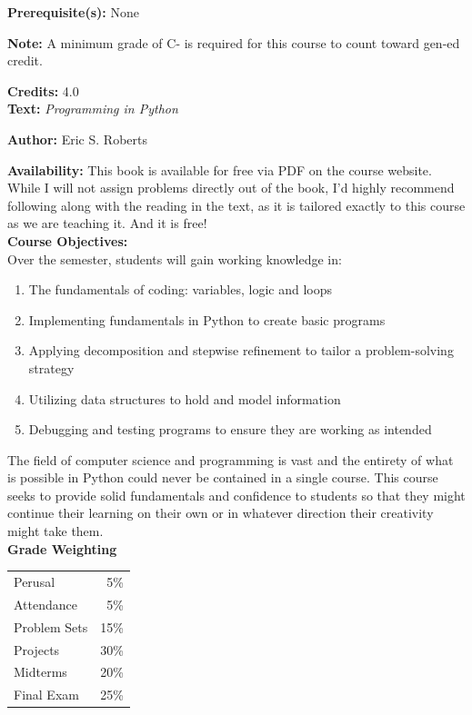 \documentclass[11pt]{article}
\begin{document}
\textbf {Prerequisite(s):} None

\textbf {Note:} A minimum grade of C- is required for this course to count toward gen-ed credit. 

\textbf {Credits:} 4.0 \\

\textbf {\large Text:} \emph{Programming in Python} 

\textbf {Author:} Eric S. Roberts

\textbf {Availability:} This book is available for free via PDF on the course website. While I will not assign problems directly out of the book, I'd highly recommend following along with the reading in the text, as it is tailored exactly to this course as we are teaching it. And it is free! \\

\newpage
\textbf {\large Course Objectives:} \\
Over the semester, students will gain working knowledge in:
\begin{enumerate} \itemsep-0.4em
  \item The fundamentals of coding: variables, logic and loops
  \item Implementing fundamentals in Python to create basic programs
  \item Applying decomposition and stepwise refinement to tailor a problem-solving strategy
  \item Utilizing data structures to hold and model information
  \item Debugging and testing programs to ensure they are working as intended
\end{enumerate}
The field of computer science and programming is vast and the entirety of what is possible in Python could never be contained in a single course. This course seeks to provide solid fundamentals and confidence to students so that they might continue their learning on their own or in whatever direction their creativity might take them. \\

\textbf {\large Grade Weighting} \\
\hspace*{40mm}
\begin{tabular}{ l r }
Perusal & 5\% \\
Attendance & 5\% \\
Problem Sets & 15\% \\
Projects & 30\% \\
Midterms & 20\% \\
Final Exam  & 25\%
\end{tabular} \\\\
\end{document}
